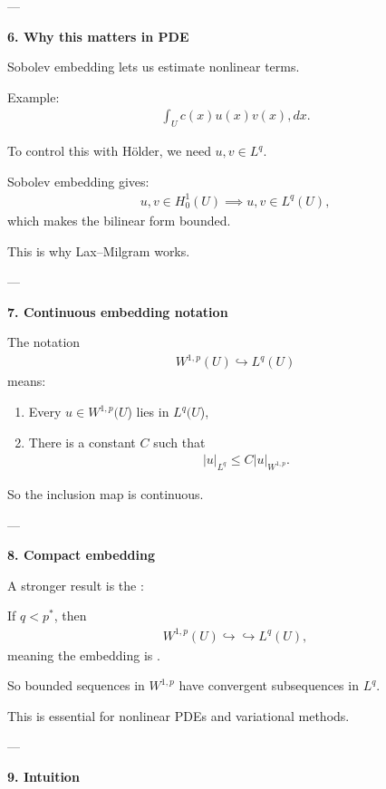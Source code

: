 \documentclass[12pt,a4paper]{report}
\begin{document}
\begin{description}
\begin{description}
---

\item \textbf{6. Why this matters in PDE}

Sobolev embedding lets us estimate nonlinear terms.

Example:
\begin{align*}
\int_U c(x)u(x)v(x),dx.
\end{align*}

To control this with Hölder, we need $u,v\in L^q$.

Sobolev embedding gives:
\begin{align*}
u,v\in H_0^1(U)\implies u,v\in L^q(U),
\end{align*}
which makes the bilinear form bounded.

This is why Lax–Milgram works.

---

\item \textbf{7. Continuous embedding notation}

The notation
\begin{align*}
W^{1,p}(U)\hookrightarrow L^q(U)
\end{align*}
means:

	\begin{enumerate}
    \item Every $u\in W^{1,p}(U$) lies in $L^q(U$),
    \item There is a constant $C$ such that
\begin{align*}
   |u|_{L^q}\le C|u|_{W^{1,p}}.
\end{align*}
	\end{enumerate}

So the inclusion map is continuous.

---

\item \textbf{8. Compact embedding}

A stronger result is the :

If $q<p^*$, then
\begin{align*}
W^{1,p}(U)\hookrightarrow\hookrightarrow L^q(U),
\end{align*}
meaning the embedding is .

So bounded sequences in $W^{1,p}$ have convergent subsequences in $L^q$.

This is essential for nonlinear PDEs and variational methods.

---

\item \textbf{9. Intuition}


\end{description}
\end{description}
\end{document}

